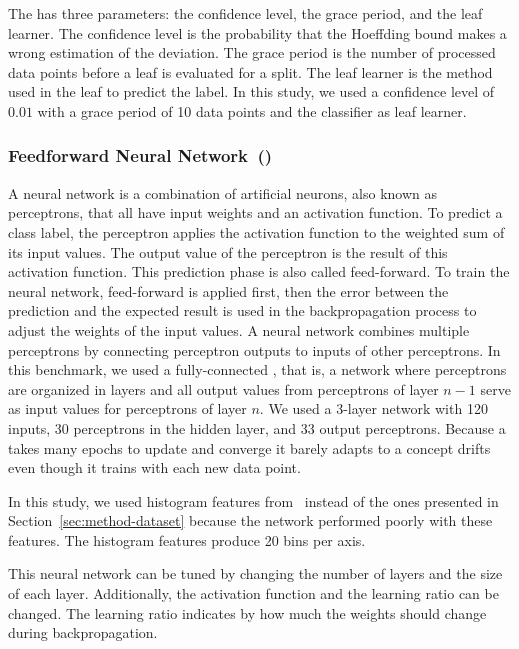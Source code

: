 The \hoeffdingtree has three parameters: the confidence level, the grace period,
and the leaf learner. The confidence level is the probability that the Hoeffding
bound makes a wrong estimation of the deviation. The grace period is the number
of processed data points before a leaf is evaluated for a split.  The leaf
learner is the method used in the leaf to predict the label.  In this study, we
used a confidence level of $0.01$ with a grace period of 10 data points and the
\naivebayes classifier as leaf learner.

\subsubsection{Feedforward Neural Network~(\FNN)}
\label{sec:method-fnn}
A neural network is a combination of artificial neurons, also known as
perceptrons, that all have input weights and an activation function.  To predict
a class label, the perceptron applies the activation function to the weighted
sum of its input values. The output value of the perceptron is the result of
this activation function.  This prediction phase is also called feed-forward. To
train the neural network, feed-forward is applied first, then the error between
the prediction and the expected result is used in the backpropagation process to
adjust the weights of the input values. A neural network combines multiple
perceptrons by connecting perceptron outputs to inputs of other perceptrons.  In
this benchmark, we used a fully-connected \FNN, that is, a network where
perceptrons are organized in layers and all output values from perceptrons of
layer $n-1$ serve as input values for perceptrons of layer $n$.  We used a
3-layer network with 120 inputs, 30 perceptrons in the hidden layer, and 33
output perceptrons.  Because a \FNN takes many epochs to update and converge it
barely adapts to a concept drifts even though it trains with each new data
point.

In this study, we used histogram features from~\cite{omid_2019} instead of the
ones presented in Section~\ref{sec:method-dataset} because the network performed
poorly with these features. The histogram features produce 20 bins per axis.

This neural network can be tuned by changing the number of layers and the size
of each layer.  Additionally, the activation function and the learning ratio can
be changed. The learning ratio indicates by how much the weights should change
during backpropagation.

